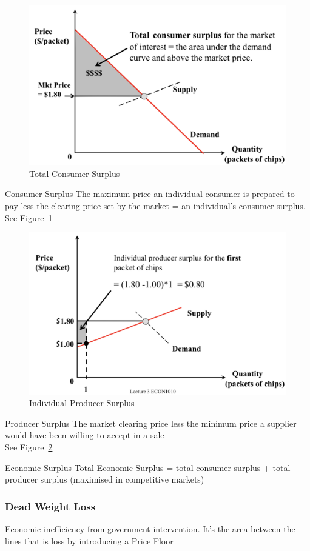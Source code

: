 \begin{figure}[H]
	\centering
	\includegraphics[width=0.9\linewidth]{consumerSurplus}
	\caption{Total Consumer Surplus}\label{fig:consumer}
\end{figure}
\begin{note}{Consumer Surplus}
	The maximum price an individual consumer is prepared to pay less the clearing price set by the market = an individual's consumer surplus.\\
	See Figure~\ref{fig:consumer}
\end{note}
\begin{figure}[H]
	\centering
	\includegraphics[width=0.9\linewidth]{producerSurplus}
	\caption{Individual Producer Surplus}\label{fig:producer}
\end{figure}
\begin{note}{Producer Surplus}
	The market clearing price less the minimum price a supplier would have been willing to accept in a sale\\
	See Figure~\ref{fig:producer}
\end{note}
\begin{note}{Economic Surplus}
	Total Economic Surplus = total consumer surplus + total producer surplus (maximised in competitive markets)
\end{note}
\subsubsection{Dead Weight Loss}
Economic inefficiency from government intervention. It's the area between the lines that is loss by introducing a Price Floor